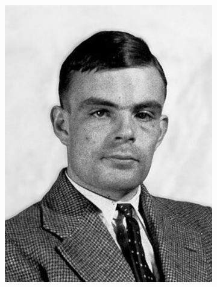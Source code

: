 \documentclass{beamer}
\begin{document}
{\begin{figure}
\begin{subfigure}{0.24\textwidth}
        \includegraphics[width=\linewidth]{images/turing.jpg}
    \end{subfigure}
    \hfill
    \begin{subfigure}{0.24\textwidth}
        \centering

\end{subfigure}
\end{figure}}
\end{document}
